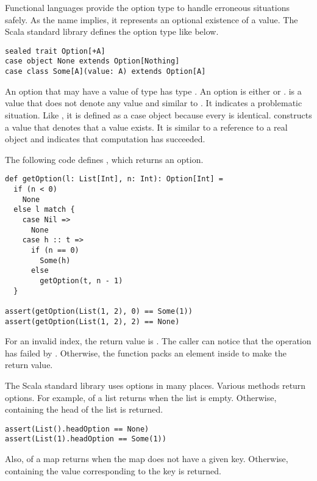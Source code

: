 Functional languages provide the option type to handle erroneous situations
safely. As the name implies, it represents an optional existence of a value.
The Scala standard library defines the option type like below.

\begin{verbatim}
sealed trait Option[+A]
case object None extends Option[Nothing]
case class Some[A](value: A) extends Option[A]
\end{verbatim}

An option that may have a value of type  has type .
An option is either  or .
 is a value that does not denote any value and similar
to . It indicates a problematic situation. Like , it is
defined as a case object because every  is identical.  constructs a value that
denotes that a value exists. It is similar to a reference to a real object and
indicates that computation has succeeded.

The following code defines , which returns an option.

\begin{verbatim}
def getOption(l: List[Int], n: Int): Option[Int] =
  if (n < 0)
    None
  else l match {
    case Nil =>
      None
    case h :: t =>
      if (n == 0)
        Some(h)
      else
        getOption(t, n - 1)
  }

assert(getOption(List(1, 2), 0) == Some(1))
assert(getOption(List(1, 2), 2) == None)
\end{verbatim}

For an invalid index, the return value is . The caller can notice
that the operation has failed by .
Otherwise, the function packs
an element inside  to make the return value.

The Scala standard library uses options in many places. Various methods return options.
For example,  of a list returns  when the list is
empty. Otherwise,  containing the head of the list is returned.

\begin{verbatim}
assert(List().headOption == None)
assert(List(1).headOption == Some(1))
\end{verbatim}

Also,  of a map returns  when the map does not have a given key.
Otherwise,  containing the value corresponding to the key is
returned.

